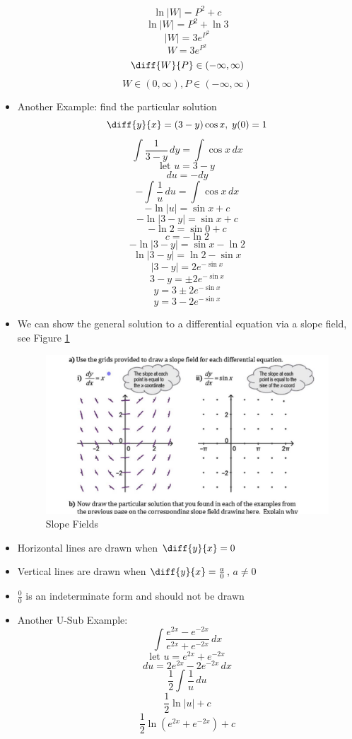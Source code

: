 \documentclass{article}
\newcommand{\letv}[1]{\text{let }#1 = }
\begin{document}
\begin{itemize}
        \[\ln|W| = P^2+c\]
        \[\ln|W| = P^2+\ln3\]
        \[|W| = 3e^{P^2}\]
        \[W = 3e^{P^2}\]
        \[\diff{W}{P}\in(-\infty,\infty)\]
        \[W\in(0,\infty), P\in(-\infty,\infty)\]
    \item Another Example: find the particular solution
        \[\diff{y}{x} = (3-y)\cos x,\;y(0) = 1\]
        \[\int\frac{1}{3-y}\,dy = \int\cos x\,dx\]
        \[\letv{u}3-y\]
        \[du = -dy\]
        \[-\int\frac{1}{u}\,du = \int\cos x\,dx\]
        \[-\ln|u| = \sin x+c\]
        \[-\ln|3-y| = \sin x+c\]
        \[-\ln2 = \sin0+c\]
        \[c = -\ln2\]
        \[-\ln|3-y| = \sin x-\ln2\]
        \[\ln|3-y| = \ln2-\sin x\]
        \[|3-y| = 2e^{-\sin x}\]
        \[3-y = \pm2e^{-\sin x}\]
        \[y = 3\pm2e^{-\sin x}\]
        \[y = 3-2e^{-\sin x}\]
    \item We can show the general solution to a differential equation via a slope field, see Figure \ref{fig:slopeFields}
    \begin{figure}[h]
        \centering
        \includegraphics[width=0.5\linewidth]{images/Slope Fields.jpg}
        \caption{Slope Fields}
        \label{fig:slopeFields}
    \end{figure}
    \item Horizontal lines are drawn when $\diff{y}{x} = 0$
    \item Vertical lines are drawn when $\diff{y}{x} = \frac{a}{0}$, $a\neq0$
    \item $\frac{0}{0}$ is an indeterminate form and should not be drawn
    \item Another U-Sub Example:
        \[\int\frac{e^{2x}-e^{-2x}}{e^{2x}+e^{-2x}}\,dx\]
        \[\letv{u}e^{2x}+e^{-2x}\]
        \[du = 2e^{2x}-2e^{-2x}\,dx\]
        \[\frac{1}{2}\int\frac{1}{u}\,du\]
        \[\frac{1}{2}\ln|u|+c\]
        \[\boxed{\frac{1}{2}\ln\left(e^{2x}+e^{-2x}\right)+c}\]
\end{itemize}

\newpage
\end{document}
